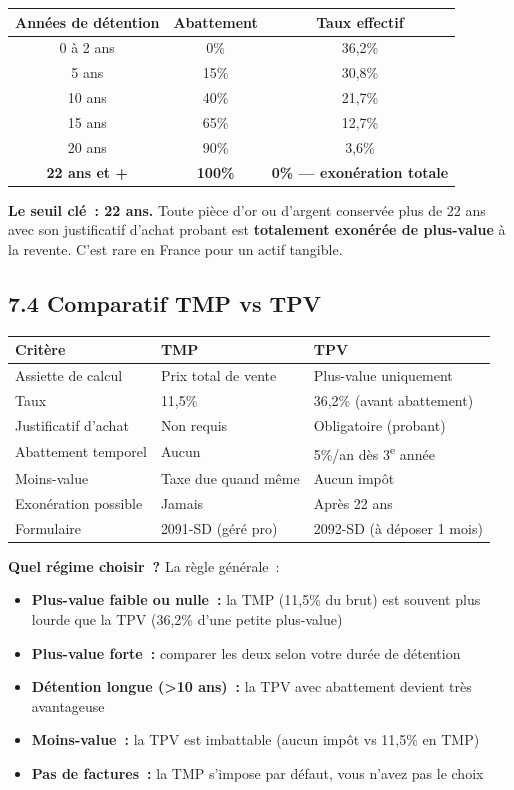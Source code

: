 \documentclass[14pt,a4paper]{extarticle}
\begin{document}
\begin{center}
\begin{tabular}{ccc}
\toprule
\textbf{Années de détention} & \textbf{Abattement} & \textbf{Taux effectif} \\
\midrule
0 à 2 ans & 0\% & 36,2\% \\
5 ans & 15\% & 30,8\% \\
10 ans & 40\% & 21,7\% \\
15 ans & 65\% & 12,7\% \\
20 ans & 90\% & 3,6\% \\
\textbf{22 ans et +} & \textbf{100\%} & \textbf{0\% --- exonération totale} \\
\bottomrule
\end{tabular}
\end{center}

\textbf{Le seuil clé~: 22 ans.} Toute pièce d'or ou d'argent conservée plus de 22 ans avec son justificatif d'achat probant est \textbf{totalement exonérée de plus-value} à la revente. C'est rare en France pour un actif tangible.

\subsection{7.4 Comparatif TMP vs TPV}

\begin{center}
\begin{tabular}{lll}
\toprule
\textbf{Critère} & \textbf{TMP} & \textbf{TPV} \\
\midrule
Assiette de calcul & Prix total de vente & Plus-value uniquement \\
Taux & 11,5\% & 36,2\% (avant abattement) \\
Justificatif d'achat & Non requis & Obligatoire (probant) \\
Abattement temporel & Aucun & 5\%/an dès 3\textsuperscript{e} année \\
Moins-value & Taxe due quand même & Aucun impôt \\
Exonération possible & Jamais & Après 22 ans \\
Formulaire & 2091-SD (géré pro) & 2092-SD (à déposer 1 mois) \\
\bottomrule
\end{tabular}
\end{center}

\textbf{Quel régime choisir~?} La règle générale~:
\begin{itemize}
  \item \textbf{Plus-value faible ou nulle~:} la TMP (11,5\% du brut) est souvent plus lourde que la TPV (36,2\% d'une petite plus-value)
  \item \textbf{Plus-value forte~:} comparer les deux selon votre durée de détention
  \item \textbf{Détention longue (>10 ans)~:} la TPV avec abattement devient très avantageuse
  \item \textbf{Moins-value~:} la TPV est imbattable (aucun impôt vs 11,5\% en TMP)
  \item \textbf{Pas de factures~:} la TMP s'impose par défaut, vous n'avez pas le choix
\end{itemize}
\end{document}
